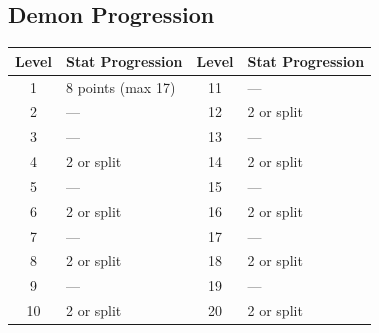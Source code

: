 \documentclass[a4paper, 10pt]{article}
\begin{document}
\subsection*{Demon Progression}
\begin{table}[h!]
\centering
\begin{tabular}{cl | cl}
\toprule
\textbf{Level} & \textbf{Stat Progression} & \textbf{Level} & \textbf{Stat Progression} \\
\midrule
1 & 8 points (max 17) & 11 & — \\
2 & — & 12 & 2 or split \\
3 & — & 13 & — \\
4 & 2 or split & 14 & 2 or split \\
5 & — & 15 & — \\
6 & 2 or split & 16 & 2 or split \\
7 & — & 17 & — \\
8 & 2 or split & 18 & 2 or split \\
9 & — & 19 & — \\
10 & 2 or split & 20 & 2 or split \\
\bottomrule
\end{tabular}
\end{table}
\end{document}
